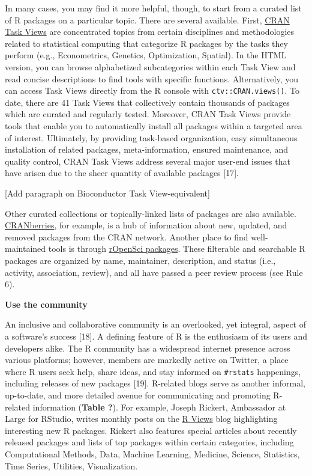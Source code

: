 \documentclass[10pt,letterpaper]{article}
\begin{document}
In many cases, you may find it more helpful, though, to start from a
curated list of R packages on a particular topic. There are several
available. First, \href{https://cran.r-project.org/web/views/}{CRAN Task
Views} are concentrated topics from certain disciplines and
methodologies related to statistical computing that categorize R
packages by the tasks they perform (e.g., Econometrics, Genetics,
Optimization, Spatial). In the HTML version, you can browse alphabetized
subcategories within each Task View and read concise descriptions to
find tools with specific functions. Alternatively, you can access Task
Views directly from the R console with \texttt{ctv::CRAN.views()}. To
date, there are 41 Task Views that collectively contain thousands of
packages which are curated and regularly tested. Moreover, CRAN Task
Views provide tools that enable you to automatically install all
packages within a targeted area of interest. Ultimately, by providing
task-based organization, easy simultaneous installation of related
packages, meta-information, ensured maintenance, and quality control,
CRAN Task Views address several major user-end issues that have arisen
due to the sheer quantity of available packages {[}17{]}.

{[}Add paragraph on Bioconductor Task View-equivalent{]}

Other curated collections or topically-linked lists of packages are also
available.
\href{http://dirk.eddelbuettel.com/cranberries/index.html}{CRANberries},
for example, is a hub of information about new, updated, and removed
packages from the CRAN network. Another place to find well-maintained
tools is through \href{https://ropensci.org/packages/}{rOpenSci
packages}. These filterable and searchable R packages are organized by
name, maintainer, description, and status (i.e., activity, association,
review), and all have passed a peer review process (see Rule 6).

\textbf{Use the community}

An inclusive and collaborative community is an overlooked, yet integral,
aspect of a software's success {[}18{]}. A defining feature of R is the
enthusiasm of its users and developers alike. The R community has a
widespread internet presence across various platforms; however, members
are markedly active on Twitter, a place where R users seek help, share
ideas, and stay informed on \texttt{\#rstats} happenings, including
releases of new packages {[}19{]}. R-related blogs serve as another
informal, up-to-date, and more detailed avenue for communicating and
promoting R-related information (\textbf{Table ?}). For example, Joseph
Rickert, Ambassador at Large for RStudio, writes monthly posts on the
\href{https://rviews.rstudio.com/}{R Views} blog highlighting
interesting new R packages. Rickert also features special articles about
recently released packages and lists of top packages within certain
categories, including Computational Methods, Data, Machine Learning,
Medicine, Science, Statistics, Time Series, Utilities, Visualization.
\end{document}
